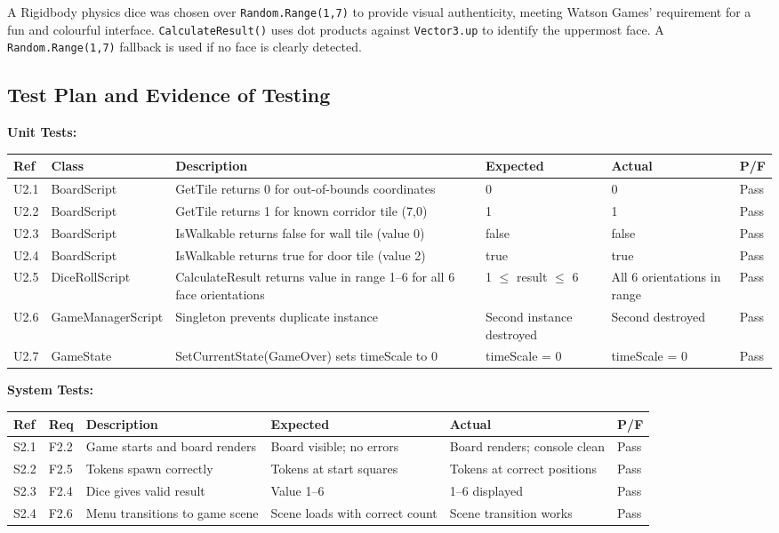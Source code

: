 A Rigidbody physics dice was chosen over \texttt{Random.Range(1,7)} to provide visual authenticity, meeting Watson Games' requirement for a fun and colourful interface. \texttt{CalculateResult()} uses dot products against \texttt{Vector3.up} to identify the uppermost face. A \texttt{Random.Range(1,7)} fallback is used if no face is clearly detected.

\subsection*{Test Plan and Evidence of Testing}

\textbf{Unit Tests:}
\begin{table}[H]
\centering
\footnotesize
\begin{tabular}{|l|l|p{4.2cm}|p{2.8cm}|p{2.5cm}|l|}
\hline
\textbf{Ref} & \textbf{Class} & \textbf{Description} & \textbf{Expected} & \textbf{Actual} & \textbf{P/F} \\ \hline
U2.1 & BoardScript & GetTile returns 0 for out-of-bounds coordinates & 0 & 0 & Pass \\ \hline
U2.2 & BoardScript & GetTile returns 1 for known corridor tile (7,0) & 1 & 1 & Pass \\ \hline
U2.3 & BoardScript & IsWalkable returns false for wall tile (value 0) & false & false & Pass \\ \hline
U2.4 & BoardScript & IsWalkable returns true for door tile (value 2) & true & true & Pass \\ \hline
U2.5 & DiceRollScript & CalculateResult returns value in range 1--6 for all 6 face orientations & 1 $\leq$ result $\leq$ 6 & All 6 orientations in range & Pass \\ \hline
U2.6 & GameManagerScript & Singleton prevents duplicate instance & Second instance destroyed & Second destroyed & Pass \\ \hline
U2.7 & GameState & SetCurrentState(GameOver) sets timeScale to 0 & timeScale = 0 & timeScale = 0 & Pass \\ \hline
\end{tabular}
\end{table}

\textbf{System Tests:}
\begin{table}[H]
\centering
\footnotesize
\begin{tabular}{|l|l|p{3.8cm}|p{2.8cm}|p{2.8cm}|l|}
\hline
\textbf{Ref} & \textbf{Req} & \textbf{Description} & \textbf{Expected} & \textbf{Actual} & \textbf{P/F} \\ \hline
S2.1 & F2.2 & Game starts and board renders & Board visible; no errors & Board renders; console clean & Pass \\ \hline
S2.2 & F2.5 & Tokens spawn correctly & Tokens at start squares & Tokens at correct positions & Pass \\ \hline
S2.3 & F2.4 & Dice gives valid result & Value 1--6 & 1--6 displayed & Pass \\ \hline
S2.4 & F2.6 & Menu transitions to game scene & Scene loads with correct count & Scene transition works & Pass \\ \hline
\end{tabular}
\end{table}

